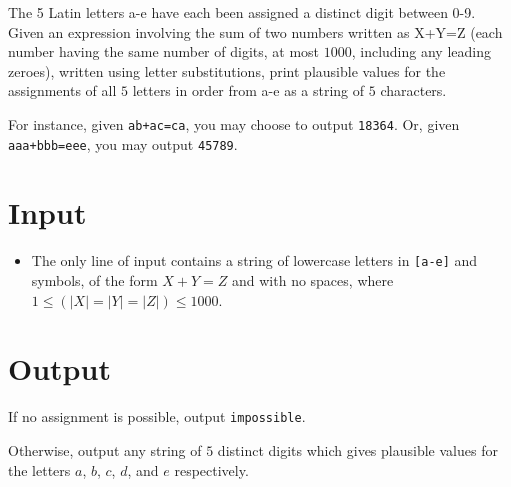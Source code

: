 
The 5 Latin letters a-e have each been assigned a distinct digit between 0-9.
Given an expression involving the sum of two numbers written as X+Y=Z
(each number having the same number of digits, at most $1000$, including any
leading zeroes), written using letter substitutions, print plausible values for
the assignments of all $5$ letters in order from a-e as a string of $5$ characters.

For instance, given \texttt{ab+ac=ca}, you may choose to output
\texttt{18364}. Or, given \texttt{aaa+bbb=eee}, you may output \texttt{45789}.

\section*{Input}

\begin{itemize}
    \item The only line of input contains a string of lowercase letters in \texttt{[a-e]}
        and symbols, of the form $X+Y=Z$ and with no spaces, where
        $1 \le (|X| = |Y| = |Z|) \le 1000$.
\end{itemize}

\section*{Output}


If no assignment is possible, output \texttt{impossible}.

Otherwise, output any string of $5$ distinct digits which gives plausible values for
the letters $a$, $b$, $c$, $d$, and $e$ respectively.
